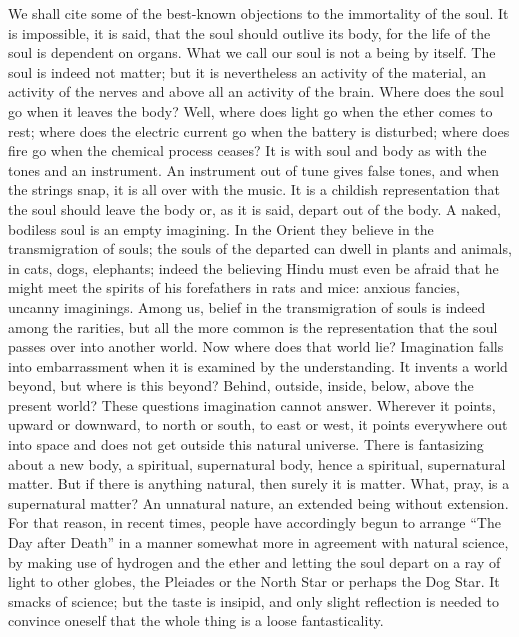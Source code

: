 \documentclass[12pt,a4paper,openany]{book}
\newcommand{\opage}[1]{\marginnote{\footnotesize\textit{[#1]}}}
\begin{document}
We shall cite some of the best-known objections to the immortality of the soul. It is impossible, it is said, that the
soul should outlive its body, for the life of the soul is dependent on organs. What we call our
\setcounter{footnote}{0}%
\opage{17}soul is not a being by itself. The soul is indeed not matter; but it is nevertheless an activity of the
material, an activity of the nerves and above all an activity of the brain. Where does the soul go when it leaves the
body? Well, where does light go when the ether comes to rest; where does the electric current go when the battery is
disturbed; where does fire go when the chemical process ceases? It is with soul and body as with the tones and an
instrument. An instrument out of tune gives false tones, and when the strings snap, it is all over with the music. It
is a childish representation that the soul should leave the body or, as it is said, depart out of the body. A naked,
bodiless soul is an empty imagining. In the Orient they believe in the transmigration of souls; the souls of the
departed can dwell in plants and animals, in cats, dogs, elephants; indeed the believing Hindu must even be afraid that
he might meet the spirits of his forefathers in rats and mice: anxious fancies, uncanny imaginings. Among us, belief in
the transmigration of souls is indeed among the rarities, but all the more common is the representation that the soul
passes over into another world. Now where does that world lie? Imagination falls into embarrassment when it is examined
by the understanding. It invents a world beyond, but where is this beyond? Behind, outside, inside, below, above the
present world? These questions imagination cannot answer. Wherever it points, upward or downward, to north or south, to
east or west, it points everywhere out into space and does not get outside this natural universe. There is
fantasizing about a new body, a spiritual, supernatural body, hence a spiritual, supernatural
\setcounter{footnote}{0}%
\opage{18}matter. But if there is anything natural, then surely it is matter. What, pray, is a supernatural matter? An
unnatural nature, an extended being without extension. For that reason, in recent times, people have accordingly begun
to arrange ``The Day after Death'' in a manner somewhat more in agreement with natural science, by making use of
hydrogen and the ether and letting the soul depart on a ray of light to other globes, the Pleiades or the North Star or
perhaps the Dog Star. It smacks of science; but the taste is insipid, and only slight reflection is needed to convince
oneself that the whole thing is a loose fantasticality.
\end{document}
